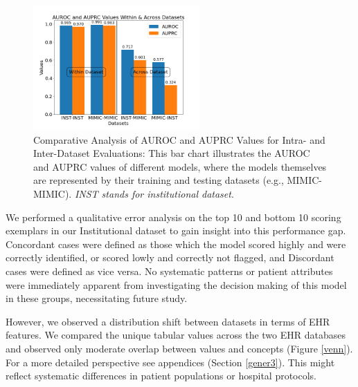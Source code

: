 \documentclass{article}
\theoremstyle{plain}
\theoremstyle{definition}
\theoremstyle{remark}
\begin{document}
{\begin{figure}[h!]
\begin{center}
\label{bar}
\centerline{\includegraphics[width=2.5in]{plots/bar2.png}}
\caption{Comparative Analysis of AUROC and AUPRC Values for Intra- and Inter-Dataset Evaluations: This bar chart illustrates the AUROC and AUPRC values of different models, where the models themselves are represented by their training and testing datasets (e.g., MIMIC-MIMIC). \textit{INST stands for institutional dataset}.}
\label{bar13}
\end{center}
\end{figure}
We performed a qualitative error analysis on the top 10 and bottom 10 scoring exemplars in our Institutional dataset to gain insight into this performance gap. Concordant cases were defined as those which the model scored highly and were correctly identified, or scored lowly and correctly not flagged, and Discordant cases were defined as vice versa. No systematic patterns or patient attributes were immediately apparent from investigating the decision making of this model in these groups, necessitating future study. 

However, we observed a distribution shift between datasets in terms of EHR features. {We compared the unique tabular values across the two EHR databases and observed only moderate overlap between values and concepts} (Figure \ref{venn}). For a more detailed perspective see appendices (Section \ref{gener3}). This might reflect systematic differences in patient populations or hospital protocols. 

}
\end{document}
